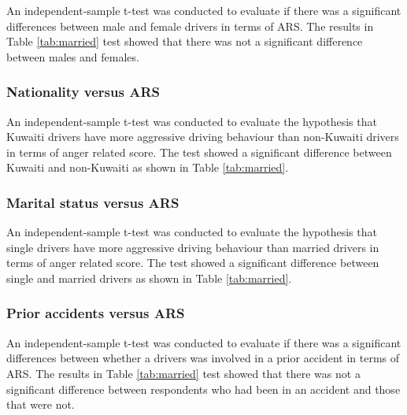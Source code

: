 \documentclass[preprint,12pt,a4paper,authoryear]{elsarticle}
\begin{document}
An independent-sample t-test was conducted to evaluate if there was a significant differences between male and female drivers in terms of ARS. The results in Table \ref{tab:married} test showed that there was not a significant difference between males and females. 

\subsubsection{Nationality versus ARS}

An independent-sample t-test was conducted to evaluate the hypothesis that Kuwaiti drivers have more aggressive driving behaviour than non-Kuwaiti drivers in terms of anger related score. The test showed a significant difference between Kuwaiti and non-Kuwaiti as shown in Table \ref{tab:married}.

\subsubsection{Marital status versus ARS}

An independent-sample t-test was conducted to evaluate the hypothesis that single drivers have more aggressive driving behaviour than married  drivers in terms of anger related score. The test showed a significant difference between single and married drivers as shown in Table \ref{tab:married}.

\subsubsection{Prior accidents versus ARS}

An independent-sample t-test was conducted to evaluate if there was a significant differences between whether a drivers was involved in a prior accident in terms of ARS. The results in Table \ref{tab:married} test showed that there was not a significant difference between respondents who had been in an accident and those that were not. 
\end{document}
